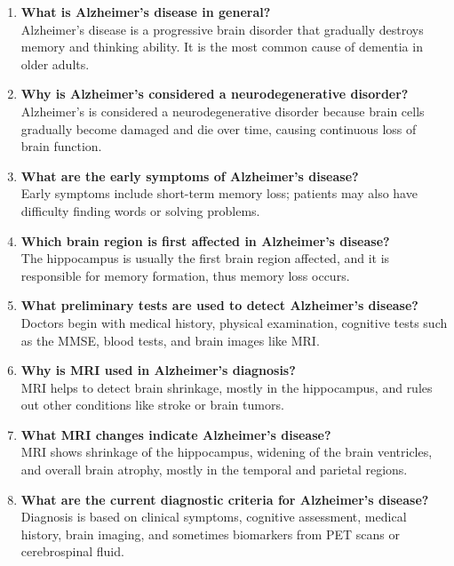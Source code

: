 \begin{enumerate}
\item \textbf{What is Alzheimer's disease in general?}\\
Alzheimer's disease is a progressive brain disorder that gradually destroys memory and thinking ability. It is the most common cause of dementia in older adults.

\item \textbf{Why is Alzheimer's considered a neurodegenerative disorder?}\\
Alzheimer's is considered a neurodegenerative disorder because brain cells gradually become damaged and die over time, causing continuous loss of brain function.

\item \textbf{What are the early symptoms of Alzheimer's disease?}\\
Early symptoms include short-term memory loss; patients may also have difficulty finding words or solving problems.

\item \textbf{Which brain region is first affected in Alzheimer's disease?}\\
The hippocampus is usually the first brain region affected, and it is responsible for memory formation, thus memory loss occurs.

\item \textbf{What preliminary tests are used to detect Alzheimer's disease?}\\
Doctors begin with medical history, physical examination, cognitive tests such as the MMSE, blood tests, and brain images like MRI.

\item \textbf{Why is MRI used in Alzheimer's diagnosis?}\\
MRI helps to detect brain shrinkage, mostly in the hippocampus, and rules out other conditions like stroke or brain tumors.

\item \textbf{What MRI changes indicate Alzheimer's disease?}\\
MRI shows shrinkage of the hippocampus, widening of the brain ventricles, and overall brain atrophy, mostly in the temporal and parietal regions.

\item \textbf{What are the current diagnostic criteria for Alzheimer's disease?}\\
Diagnosis is based on clinical symptoms, cognitive assessment, medical history, brain imaging, and sometimes biomarkers from PET scans or cerebrospinal fluid.


\end{enumerate}
